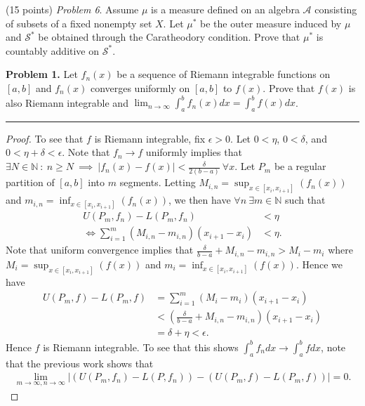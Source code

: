 \documentclass[leqno]{article}
\theoremstyle{nonumberplain}
\newtheorem{proof}{Proof}
\newcommand{\N}{\mathbb{N}}
\begin{document}
\bigskip
\bigskip
\noindent
(15 points) \textit{Problem 6}. \quad
Assume $ \mu $ is a measure defined on an algebra $ \mathcal{A} $
consisting of subsets of a fixed nonempty set $ X $.
Let $ \mu^* $ be the outer measure induced by $ \mu $
and $ \mathcal{S}^* $ be obtained through the Caratheodory condition.
Prove that $ \mu^* $ is countably additive on $ \mathcal{S}^* $.


\pagebreak


\noindent\textbf{Problem 1.} \quad
Let $ f_n(x) $ be a sequence of Riemann integrable functions on $ [a,b] $
and $ f_n(x) $ converges uniformly on $ [a,b] $ to $ f(x) $.
Prove that $ f(x) $ is also Riemann integrable and
$ \displaystyle \lim_{n \to \infty} \int_a^b f_n(x)dx = \int_a^b f(x) dx $.

\noindent\rule[0.5ex]{\linewidth}{1pt}

\begin{proof}
To see that $f$ is Riemann integrable, fix $\epsilon>0$.  Let $0<\eta$, $0<\delta$, and $0<\eta+\delta<\epsilon$. Note that $f_n \to f$ uniformly implies that $\exists N \in \N ~ \colon ~ n\geq N ~ \implies ~ |f_n(x)-f(x)|<\frac{\delta}{2(b-a)} ~ \forall x$.  Let $P_m$ be a regular partition of $[a,b]$ into $m$ segments.  Letting $M_{i,n}=\sup_{x\in [x_i,x_{i+1}]}(f_n(x))$ and $m_{i,n}=\inf_{x\in [x_i,x_{i+1}]}(f_n(x))$, we then have $\forall n ~ \exists m \in \N$ such that 
\begin{align*}
U(P_m,f_n)-L(P_m,f_n)&<\eta\\
\iff \sum_{i=1}^m (M_{i,n}-m_{i,n})(x_{i+1}-x_i)&< \eta.
\end{align*}
Note that uniform convergence implies that $\frac{\delta}{b-a}+M_{i,n}-m_{i,n}> M_i-m_i$ where $M_i=\sup_{x \in [x_i,x_{i+1}]}(f(x))$ and $m_i=\inf_{x\in [x_i,x_{i+1}]}(f(x))$. Hence we have
\begin{align*}
U(P_m,f)-L(P_m,f)&=\sum_{i=1}^m (M_i-m_i)(x_{i+1}-x_i)\\
&< \left(\frac{\delta}{b-a}+M_{i,n}-m_{i,n}\right)(x_{i+1}-x_i)\\
&= \delta+\eta < \epsilon.
\end{align*}
Hence $f$ is Riemann integrable. To see that this shows $\int_a^b f_n dx \to \int_a^b fdx$, note that the previous work shows that 
\begin{align*}
\lim_{m\to \infty,n\to \infty}|(U(P_m,f_n)-L(P,f_n))-(U(P_m,f)-L(P_m,f))|=0.
\end{align*}
\end{proof}
\end{document}

